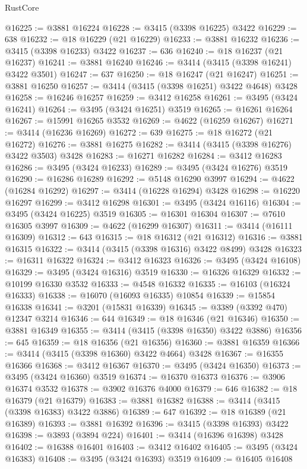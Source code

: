 \begin{lexlean}{RustCore}
\begin{coremodule}
@16225 := @3881 @16224
@16228 := @3415 (@3398 @16225) @3422
@16229 := 638
@16232 := @18 @16229 (@21 @16229)
@16233 := @3881 @16232
@16236 := @3415 (@3398 @16233) @3422
@16237 := 636
@16240 := @18 @16237 (@21 @16237)
@16241 := @3881 @16240
@16246 := @3414 (@3415 (@3398 @16241) @3422 @3501)
@16247 := 637
@16250 := @18 @16247 (@21 @16247)
@16251 := @3881 @16250
@16257 := @3414 (@3415 (@3398 @16251) @3422 @4648) @3428
@16258 := @16246 @16257
@16259 := @3412 @16258
@16261 := @3495 (@3424 @16241)
@16264 := @3495 (@3424 @16251) @3519
@16265 := @16261 @16264
@16267 := @15991 @16265 @3532
@16269 := @4622 (@16259 @16267)
@16271 := @3414 (@16236 @16269)
@16272 := 639
@16275 := @18 @16272 (@21 @16272)
@16276 := @3881 @16275
@16282 := @3414 (@3415 (@3398 @16276) @3422 @3503) @3428
@16283 := @16271 @16282
@16284 := @3412 @16283
@16286 := @3495 (@3424 @16233)
@16289 := @3495 (@3424 @16276) @3519
@16290 := @16286 @16289
@16292 := @5148 @16290 @3997
@16294 := @4622 (@16284 @16292)
@16297 := @3414 (@16228 @16294) @3428
@16298 := @16220 @16297
@16299 := @3412 @16298
@16301 := @3495 (@3424 @16116)
@16304 := @3495 (@3424 @16225) @3519
@16305 := @16301 @16304
@16307 := @7610 @16305 @3997
@16309 := @4622 (@16299 @16307)
@16311 := @3414 (@16111 @16309)
@16312 := 643
@16315 := @18 @16312 (@21 @16312)
@16316 := @3881 @16315
@16322 := @3414 (@3415 (@3398 @16316) @3422 @8499) @3428
@16323 := @16311 @16322
@16324 := @3412 @16323
@16326 := @3495 (@3424 @16108)
@16329 := @3495 (@3424 @16316) @3519
@16330 := @16326 @16329
@16332 := @10199 @16330 @3532
@16333 := @4548 @16332
@16335 := @16103 (@16324 @16333)
@16338 := @16070 (@16093 @16335) @10854
@16339 := @15854 @16338
@16341 := @3201 (@15831 @16339)
@16345 := @3389 (@3392 @470) @12347 @3214
@16346 := 644
@16349 := @18 @16346 (@21 @16346)
@16350 := @3881 @16349
@16355 := @3414 (@3415 (@3398 @16350) @3422 @3886)
@16356 := 645
@16359 := @18 @16356 (@21 @16356)
@16360 := @3881 @16359
@16366 := @3414 (@3415 (@3398 @16360) @3422 @4664) @3428
@16367 := @16355 @16366
@16368 := @3412 @16367
@16370 := @3495 (@3424 @16350)
@16373 := @3495 (@3424 @16360) @3519
@16374 := @16370 @16373
@16376 := @3906 @16374 @3532
@16378 := @3902 @16376 @4000
@16379 := 646
@16382 := @18 @16379 (@21 @16379)
@16383 := @3881 @16382
@16388 := @3414 (@3415 (@3398 @16383) @3422 @3886)
@16389 := 647
@16392 := @18 @16389 (@21 @16389)
@16393 := @3881 @16392
@16396 := @3415 (@3398 @16393) @3422
@16398 := @3893 (@3894 @224)
@16401 := @3414 (@16396 @16398) @3428
@16402 := @16388 @16401
@16403 := @3412 @16402
@16405 := @3495 (@3424 @16383)
@16408 := @3495 (@3424 @16393) @3519
@16409 := @16405 @16408

\end{coremodule}
\end{lexlean}
